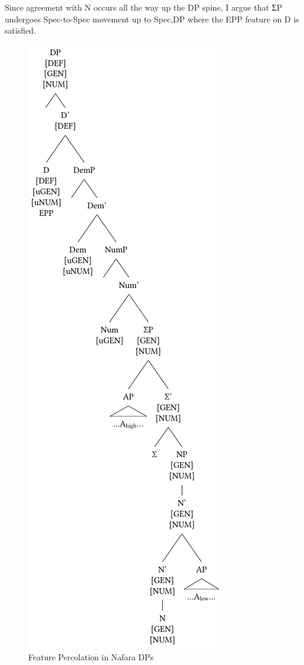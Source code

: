 \documentclass[output=paper]{langscibook}
\begin{document}
Since agreement with N occurs all the way up the DP spine, I argue that ƩP undergoes Spec-to-Spec movement up to Spec,DP where the EPP feature on D is satisfied.

  
\begin{figure}
\includegraphics[height=\textheight]{figures/baron-img4.pdf}
\caption{Feature Percolation in Nafara DPs}
\label{fig:baron:4}
\end{figure}
\end{document}
